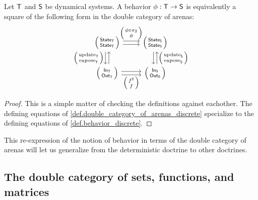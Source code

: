 \documentclass[DynamicalBook]{subfiles}
\begin{document}
\begin{proposition}\label{prop.behavior_as_square_of_arenas_discrete}
  Let $\mathsf{T}$ and $\mathsf{S}$ be dynamical systems. A behavior $\phi : \mathsf{T}
  \to \mathsf{S}$ is equivalently a square of the following form in the double
  category of arenas:
  \begin{equation}\label{eqn.behavior_as_square_of_arenas_discrete}
    \begin{tikzcd}
      \lens{\State{T}}{\State{T}} \ar[r, shift left, "\lens{\phi \circ
        \pi_2}{\phi}"] \ar[r, shift right] \ar[d, shift right,
      "\lens{\update{T}}{\expose{T}}"'] \ar[d, shift left, leftarrow] &
      \lens{\State{S}}{\State{S}} \ar[d, shift left, leftarrow,
      "\lens{\update{S}}{\expose{S}}"] \ar[d, shift right]\\
      \lens{\In{T}}{\Out{T}} \ar[r, shift right, "\lens{f^{\sharp}}{f}"'] \ar[r,
      shift left] & \lens{\In{S}}{\Out{S}}
    \end{tikzcd}
  \end{equation}
\end{proposition}
\begin{proof}
  This is a simple matter of checking the definitions against eachother. The
  defining equations of \cref{def.double_category_of_arenas_discrete} specialize
  to the defining equations of \cref{def.behavior_discrete}.
\end{proof}

This re-expression of the notion of behavior in terms of the double category of
arenas will let us generalize from the deterministic doctrine to other
doctrines.


\subsection{The double category of sets, functions, and matrices}\label{sec.double_cat_of_matrices}
\end{document}

